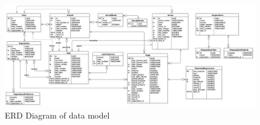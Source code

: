 \begin{figure}
    \centering
    \includegraphics[scale=0.31, angle=90]{assets/erd_diagram.png}
    \caption{ERD Diagram of data model\cite{dataModel}}
    \label{fig:erd-diagram}
\end{figure}
